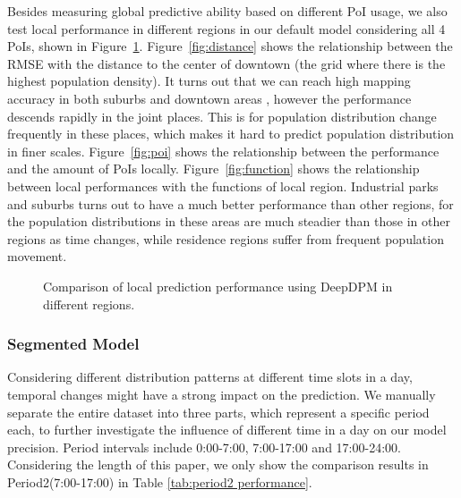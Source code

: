 \documentclass[letterpaper]{article} %
\begin{document}
Besides measuring global predictive ability based on different PoI usage, we also test local performance in different regions in our default model considering all 4 PoIs, shown in Figure~\ref{fig:variations}. Figure~\ref{fig:distance} shows the relationship between the RMSE with the distance to the center of downtown (the grid where there is the highest population density). It turns out that we can reach high mapping accuracy in both suburbs and downtown areas , however the performance descends rapidly in the joint places. This is for population distribution change frequently in these places, which makes it hard to predict population distribution in finer scales. Figure~\ref{fig:poi} shows the relationship between the performance and the amount of PoIs locally. Figure~\ref{fig:function} shows the relationship between local performances with the functions of local region. Industrial parks and suburbs turns out to have a much better performance than other regions, for the population distributions in these areas are much steadier than those in other regions as time changes, while residence regions suffer from frequent population movement. 

\begin{figure}[h]
    \centering
    \caption{Comparison of local prediction performance using DeepDPM in different regions.}
    \label{fig:variations}
\end{figure}

\subsubsection{Segmented Model}

Considering different distribution patterns at different time slots in a day, temporal changes might have a strong impact on the prediction. We manually separate the entire dataset into three parts, which represent a specific period each, to further investigate the influence of different time in a day on our model precision. Period intervals include 0:00-7:00, 7:00-17:00 and 17:00-24:00. Considering the length of this paper, we only show the comparison results in Period2(7:00-17:00) in Table \ref{tab:period2 performance}.
\end{document}
